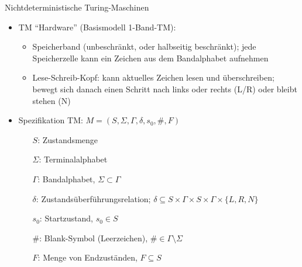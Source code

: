 \begin{frame}{Nichtdeterministische Turing-Maschinen}
	\begin{itemize}
		\item TM "`Hardware"' (Basismodell 1-Band-TM):
		\begin{itemize}
			\item Speicherband (unbeschränkt, oder halbseitig beschränkt); jede Speicherzelle kann ein Zeichen aus dem Bandalphabet aufnehmen
			\item Lese-Schreib-Kopf: kann aktuelles Zeichen lesen und überschreiben; bewegt sich danach einen Schritt nach links oder rechts (L/R) oder bleibt stehen (N)
		\end{itemize}
		\item Spezifikation TM: $M=(S, \Sigma, \Gamma, \delta, s_0, \#, F)$
		\begin{itemize}
			\item [$S$:] Zustandsmenge
			\item [$\Sigma$:] Terminalalphabet
			\item[$\Gamma$:] Bandalphabet, $\Sigma \subset \Gamma$
			\item[$\delta$:] Zustandsüberführungsrelation; $\delta \subseteq S \times \Gamma \times S \times \Gamma \times \{L, R, N\}$
			\item[$s_0$:] Startzustand, $s_0 \in S$
			\item[$\#$:] Blank-Symbol (Leerzeichen), $\# \in \Gamma \setminus \Sigma$
			\item[$F$:] Menge von Endzuständen, $F \subseteq S$
		\end{itemize}
	\end{itemize}
\end{frame}


